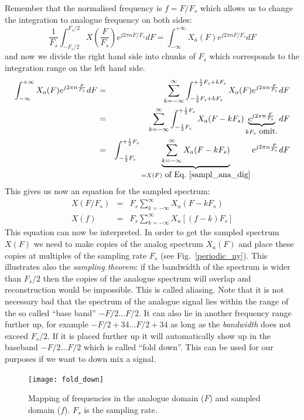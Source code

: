 \documentclass[12pt,a4paper]{article}
\begin{document}
Remember that the normalised frequency is $f=F/F_s$ which allows us
to change the integration to analogue frequency on both sides:
\begin{equation}
\frac{1}{F_s} \int_{-F_s/2}^{F_s/2} X(\frac{F}{F_s}) e^{j 2 \pi n F/F_s} dF
=
\int_{-\infty}^{+\infty} X_a(F) e^{j 2\pi n F/F_s} dF
\label{sampl_ana_dig}
\end{equation}
and now we divide the right hand side into chunks of $F_s$ which corresponds
to the integration range on the left hand side.
\begin{eqnarray}
\int_{-\infty}^{+\infty} X_a(F) e^{j 2\pi n \frac{F}{F_s}} dF
& = &
\sum_{k=-\infty}^{\infty} \int_{-\frac{1}{2} F_s + k F_s}^{+\frac{1}{2} F_s + k F_s} X_a(F) e^{j2\pi n \frac{F}{F_s}} dF \\
& = &
\sum_{k=-\infty}^{\infty} \int_{-\frac{1}{2} F_s}^{+\frac{1}{2} F_s} X_a(F-k F_s) \underbrace{e^{j2\pi n\frac{F}{F_s}}}_{k F_s \mbox{ omit.}} dF \\
& = &
\int_{-\frac{1}{2} F_s}^{+\frac{1}{2} F_s} \underbrace{\sum_{k=-\infty}^{\infty} X_a(F-k F_s)}_{=X(F) \mbox{ of Eq.~\ref{sampl_ana_dig}}} e^{j2\pi n\frac{F}{F_s}} dF
\end{eqnarray}
This gives us now an equation for the sampled spectrum:
\begin{eqnarray}
X(F/F_s) & = & F_s \sum_{k=-\infty}^{\infty} X_a(F-kF_s) \\
X(f) & = & F_s \sum_{k=-\infty}^{\infty} X_a[(f-k)F_s]
\end{eqnarray}
This equation can now be interpreted. In order to get the sampled
spectrum $X(F)$ we need to make copies of the analog spectrum
$X_a(F)$ and place these copies at multiples of the sampling rate
$F_s$ (see Fig.~\ref{periodic_ny}). This illustrates also the
\textsl{sampling theorem}: if the bandwidth of the spectrum is wider
than $F_s/2$ then the copies of the analogue spectrum will overlap and
reconstruction would be impossible. This is called aliasing. Note that
it is not necessary bad that the spectrum of the analogue signal lies
within the range of the so called ``base band'' $-F/2 \ldots F/2$. It
can also lie in another frequency range further up, for example $-F/2
+ 34 \ldots F/2 +34$ as long as the
\textsl{bandwidth} does not exceed $F_s/2$. If it is placed further up
it will automatically show up in the baseband $-F/2 \ldots F/2$ which
is called ``fold down''. This can be used for our purposes if we
want to down mix a signal.

\begin{figure}[!hbt]
\begin{center}
\mbox{\texttt{[image: fold\_down]}}
\end{center}
\caption{Mapping of frequencies in the analogue domain ($F$)
and sampled domain ($f$). $F_s$ is the sampling rate.
\label{fold_down}}
\end{figure}
\end{document}
